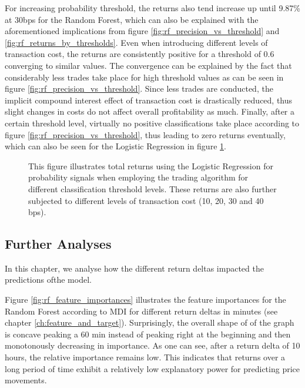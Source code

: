 For increasing probability threshold, the returns also tend increase up until 9.87\% at 30bps for the Random Forest, 
which can also be explained with the aforementioned implications 
from figure \ref{fig:rf_precision_vs_threshold} and \ref{fig:rf_returns_by_thresholds}. 
Even when introducing different levels of transaction cost, the returns are consistently positive
for a threshold of 0.6 converging to similar values. 
The convergence can be explained by the fact that considerably less trades take place for high threshold values as can be seen in figure \ref{fig:rf_precision_vs_threshold}.
Since less trades are conducted, the implicit compound interest effect of transaction cost is drastically reduced,
thus slight changes in costs do not affect overall profitability as much. 
Finally, after a certain threshold level, virtually no positive classifications take place according to figure \ref{fig:rf_precision_vs_threshold},
thus leading to zero returns eventually, which can also be seen for the Logistic Regression in figure \ref{fig:logistic_returns_by_thresholds}.

\begin{figure}[H]
    \captionsetup{format=plain}
    \caption{ 
            This figure illustrates total returns using the Logistic Regression for probability signals when employing the trading 
            algorithm for different classification threshold levels. 
            These returns are also further subjected to different levels of transaction cost (10, 20, 30 and 40 bps).
        }
    \label{fig:logistic_returns_by_thresholds}
\end{figure}




\subsection{Further Analyses}
In this chapter, we analyse how the different return deltas impacted the predictions ofthe model.

Figure \ref{fig:rf_feature_importances} illustrates the feature importances for the Random Forest according to MDI \cite{louppe2015variableImportance}
for different return deltas in minutes (see chapter \ref{ch:feature_and_target}).
Surprisingly, the overall shape of of the graph is concave peaking a 60 min 
instead of peaking right at the beginning and then monotonously decreasing in importance.
As one can see, after a return delta of 10 hours, the relative importance remains low. 
This indicates that returns over a long period of time exhibit a relatively low explanatory power for
predicting price movements.

